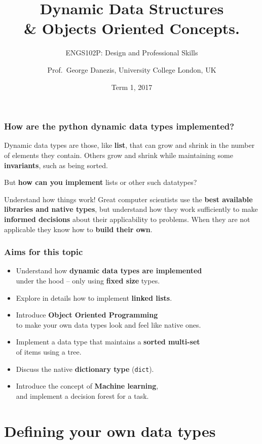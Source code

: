 \documentclass{beamer} %
\author{Prof.\ George Danezis, University College London, UK}
\title{Dynamic Data Structures \\ \& Objects Oriented Concepts.}
\subtitle{ENGS102P: Design and Professional Skills }
\date{Term 1, 2017}
\newcommand\emc[1]{\textcolor{brightblue}{\textbf{#1}}}
\begin{document}
\nobibliography*


\frame{
\titlepage
}

\begin{frame}
\frametitle{How are the python dynamic data types implemented?}

Dynamic data types are those, like \emc{list}, that can grow and shrink in the number of elements they contain. Others grow and shrink while maintaining some \emc{invariants}, such as being sorted.

\vspace{3mm}
But \emc{how can you implement} lists or other such datatypes?

\vspace{3mm}
\begin{block}{Understand how things work!}
Great computer scientists use the \emc{best available libraries and native types}, but understand how they work sufficiently to make \emc{informed decisions} about their applicability to problems. When they are not applicable they know how to \emc{build their own}.
\end{block}

\end{frame}

\begin{frame}
\frametitle{Aims for this topic}

\begin{itemize}
	\item Understand how \emc{dynamic data types are implemented} \\ under the hood -- only using \emc{fixed size} types.
	\item Explore in details how to implement \emc{linked lists}.
	\item Introduce \emc{Object Oriented Programming} \\ to make your own data types look and feel like native ones.
	\item Implement a data type that maintains a \emc{sorted multi-set} \\ of items using a tree.
	\item Discuss the native \emc{dictionary type} (\texttt{dict}).
	\item Introduce the concept of \emc{Machine learning}, \\ and implement a decision forest for a task.
\end{itemize}

\end{frame}


\section{Defining your own data types}
\end{document}
